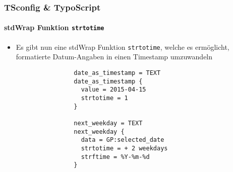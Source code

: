 %
\begin{frame}[fragile]
	\frametitle{TSconfig \& TypoScript}
	\framesubtitle{stdWrap Funktion \texttt{strtotime}}

	\begin{itemize}
		\item Es gibt nun eine stdWrap Funktion \texttt{strtotime}, welche es
			ermöglicht, formatierte Datum-Angaben in einen Timestamp umzuwandeln

			\begin{lstlisting}
				date_as_timestamp = TEXT
				date_as_timestamp {
				  value = 2015-04-15
				  strtotime = 1
				}

				next_weekday = TEXT
				next_weekday {
				  data = GP:selected_date
				  strtotime = + 2 weekdays
				  strftime = %Y-%m-%d
				}
			\end{lstlisting}

	\end{itemize}

\end{frame}


